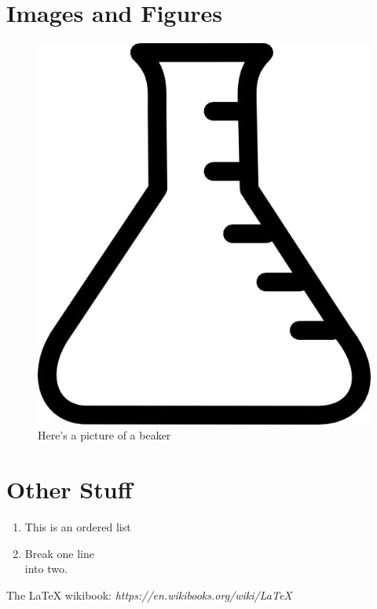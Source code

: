 \documentclass[11pt]{article} %
\begin{document}
\section*{Images and Figures} %
\begin{figure}[h] %
\begin{center}
	\includegraphics[scale=0.1]{beaker} %
\end{center}
\caption{Here's a picture of a beaker}
\end{figure}

\section{Other Stuff}
\begin{enumerate} %
	\item This is an ordered list
	\item Break one line \\ into two.
\end{enumerate}


\begin{thebibliography}{1}
	 The LaTeX wikibook: {\em https://en.wikibooks.org/wiki/LaTeX}
\end{thebibliography}
\end{document}
